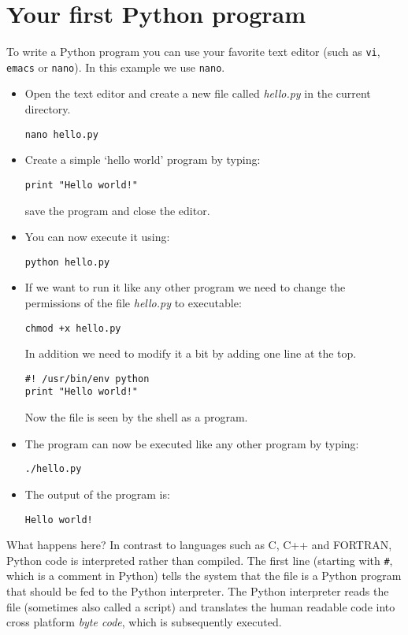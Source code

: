 \documentclass[10pt,a4paper]{article}
\begin{document}
\section{Your first Python program}
To write a Python program you can use your favorite text editor (such as \verb|vi|, \verb|emacs| or \verb|nano|). In this example we use \verb|nano|.
\begin{itemize}
\item Open the text editor and create a new file called \emph{hello.py} in the current directory.
\begin{Verbatim}
nano hello.py
\end{Verbatim}
\item Create a simple `hello world' program by typing:
\begin{lstlisting}
print "Hello world!"
\end{lstlisting}
save the program and close the editor.
\item You can now execute it using:
\begin{Verbatim}
python hello.py
\end{Verbatim}
\item If we want to run it like any other program we need to change the permissions of the file \emph{hello.py} to executable:
\begin{Verbatim}
chmod +x hello.py
\end{Verbatim}
In addition we need to modify it a bit by adding one line at the top.
\begin{lstlisting}
#! /usr/bin/env python
print "Hello world!"
\end{lstlisting}
Now the file is seen by the shell as a program.
\item The program can now be executed like any other program by typing:
\begin{Verbatim}
./hello.py
\end{Verbatim}
\item The output of the program is:
\begin{Verbatim}
Hello world!
\end{Verbatim}
\end{itemize}
What happens here?
In contrast to languages such as C, C++ and FORTRAN, Python code is interpreted rather than compiled.
The first line (starting with \verb|#|, which is a comment in Python) tells the system that the file is a Python program that should be fed to the Python interpreter.
The Python interpreter reads the file (sometimes also called a script) and translates the human readable code into cross platform \emph{byte code}, which is subsequently executed.
\end{document}
